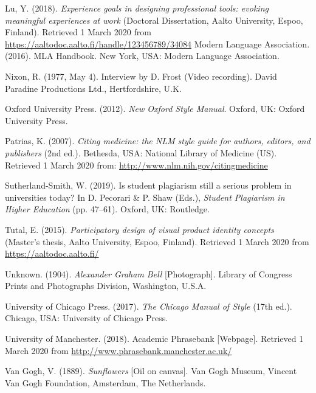 \documentclass[english, 12pt, a4paper, sci, utf8, a-2b, online]{aaltothesis}
\begin{document}
\vspace{1ex}
\noindent
Lu, Y. (2018). 
\textit{Experience goals in designing professional tools: evoking meaningful 
	experiences at work} 
(Doctoral Dissertation, Aalto University, Espoo, Finland). 
Retrieved 1 March 2020 from 
\url{https://aaltodoc.aalto.fi/handle/123456789/34084} 
Modern Language Association. (2016). MLA Handbook. New York, USA: Modern 
Language Association.

\vspace{1ex}
\noindent
Nixon, R. (1977, May 4). Interview by D. Frost (Video recording). 
David Paradine Productions Ltd., Hertfordshire, U.K.

\vspace{1ex}
\noindent
Oxford University Press. (2012). 
\textit{New Oxford Style Manual}. Oxford, UK: Oxford University Press.

\vspace{1ex}
\noindent
Patrias, K. (2007). 
\textit{Citing medicine: the NLM style guide for authors, editors, and 
	publishers} 
(2nd ed.). Bethesda, USA: National Library of Medicine (US). 
Retrieved 1 March 2020 from: \url{http://www.nlm.nih.gov/citingmedicine}

\vspace{1ex}
\noindent
Sutherland-Smith, W. (2019). Is student plagiarism still a serious problem in 
universities today? In D. Pecorari \& P. Shaw (Eds.), 
\textit{Student Plagiarism in Higher Education} (pp. 47--61). 
Oxford, UK: Routledge.

\vspace{1ex}
\noindent
Tutal, E. (2015). 
\textit{Participatory design of visual product identity concepts} 
(Master’s thesis, Aalto University, Espoo, Finland). 
Retrieved 1 March 2020 from \url{https://aaltodoc.aalto.fi/}

\vspace{1ex}
\noindent
Unknown. (1904). \textit{Alexander Graham Bell} [Photograph]. 
Library of Congress Prints and Photographs Division, Washington, U.S.A.

\vspace{1ex}
\noindent
University of Chicago Press. (2017). \textit{The Chicago Manual of Style} 
(17th ed.). Chicago, USA: University of Chicago Press.

\vspace{1ex}
\noindent
University of Manchester. (2018). Academic Phrasebank [Webpage]. 
Retrieved 1 March 2020 from \url{http://www.phrasebank.manchester.ac.uk/}

\vspace{1ex}
\noindent
Van Gogh, V. (1889). \textit{Sunflowers} [Oil on canvas]. 
Van Gogh Museum, Vincent Van Gogh Foundation, Amsterdam, The Netherlands.
\end{document}
